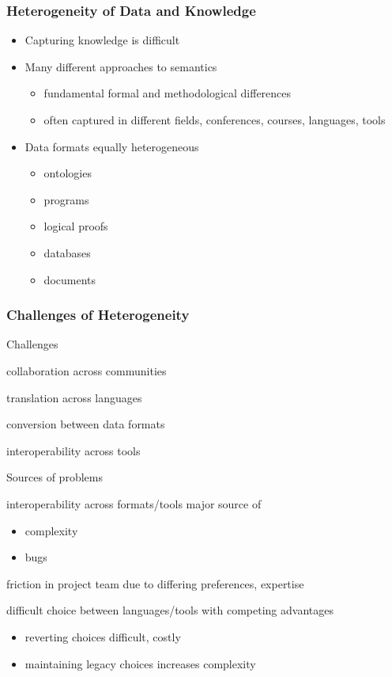 \documentclass{beamer}
\begin{document}
\begin{frame}\frametitle{Heterogeneity of Data and Knowledge}
\begin{itemize}
\item Capturing knowledge is difficult
\item Many different approaches to semantics
 \begin{itemize}
  \item fundamental formal and methodological differences
  \item often captured in different fields, conferences, courses, languages, tools
 \end{itemize}
\item Data formats equally heterogeneous
 \begin{itemize}
 \item ontologies
 \item programs
 \item logical proofs
 \item databases
 \item documents
 \end{itemize}
\end{itemize}
\end{frame}

\begin{frame}\frametitle{Challenges of Heterogeneity}
\begin{blockitems}{Challenges}
\item collaboration across communities
\item translation across languages
\item conversion between data formats
\item interoperability across tools
\end{blockitems}

\begin{blockitems}{Sources of problems}
\item interoperability across formats/tools major source of
 \begin{itemize}
 \item complexity
 \item bugs
 \end{itemize}
\item friction in project team due to differing preferences, expertise
\item difficult choice between languages/tools with competing advantages
\begin{itemize}
 \item reverting choices difficult, costly
 \item maintaining legacy choices increases complexity
\end{itemize}
\end{blockitems}
\end{frame}
\end{document}
